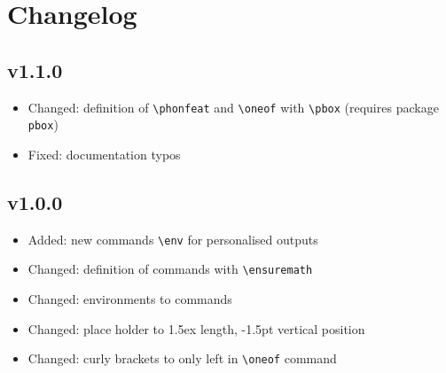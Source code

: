 \documentclass[a4paper]{article}
\begin{document}
\section{Changelog}
\subsection{v1.1.0}
\begin{itemize}
\item Changed: definition of \verb+\phonfeat+ and \verb+\oneof+ with \verb+\pbox+ (requires package \texttt{pbox})
\item Fixed: documentation typos
\end{itemize}

\subsection{v1.0.0}
\begin{itemize}
\item Added: new commands \verb|\env| for personalised outputs
\item Changed: definition of commands with \verb|\ensuremath|
\item Changed: environments to commands
\item Changed: place holder to 1.5ex length, -1.5pt vertical position
\item Changed: curly brackets to only left in \verb|\oneof| command
\end{itemize}
\end{document}
